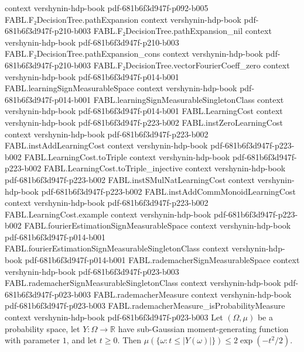 \begin{theorem}
  {context}
  {vershynin-hdp-book}
  {pdf-681b6f3d947f-p092-b005}
\proofstep
  {FABL.F₂DecisionTree.pathExpansion}
  {context}
  {vershynin-hdp-book}
  {pdf-681b6f3d947f-p210-b003}
\proofstep
  {FABL.F₂DecisionTree.pathExpansion_nil}
  {context}
  {vershynin-hdp-book}
  {pdf-681b6f3d947f-p210-b003}
\proofstep
  {FABL.F₂DecisionTree.pathExpansion_cons}
  {context}
  {vershynin-hdp-book}
  {pdf-681b6f3d947f-p210-b003}
\proofstep
  {FABL.F₂DecisionTree.vectorFourierCoeff_zero}
  {context}
  {vershynin-hdp-book}
  {pdf-681b6f3d947f-p014-b001}
\proofstep
  {FABL.learningSignMeasurableSpace}
  {context}
  {vershynin-hdp-book}
  {pdf-681b6f3d947f-p014-b001}
\proofstep
  {FABL.learningSignMeasurableSingletonClass}
  {context}
  {vershynin-hdp-book}
  {pdf-681b6f3d947f-p014-b001}
\proofstep
  {FABL.LearningCost}
  {context}
  {vershynin-hdp-book}
  {pdf-681b6f3d947f-p223-b002}
\proofstep
  {FABL.instZeroLearningCost}
  {context}
  {vershynin-hdp-book}
  {pdf-681b6f3d947f-p223-b002}
\proofstep
  {FABL.instAddLearningCost}
  {context}
  {vershynin-hdp-book}
  {pdf-681b6f3d947f-p223-b002}
\proofstep
  {FABL.LearningCost.toTriple}
  {context}
  {vershynin-hdp-book}
  {pdf-681b6f3d947f-p223-b002}
\proofstep
  {FABL.LearningCost.toTriple_injective}
  {context}
  {vershynin-hdp-book}
  {pdf-681b6f3d947f-p223-b002}
\proofstep
  {FABL.instSMulNatLearningCost}
  {context}
  {vershynin-hdp-book}
  {pdf-681b6f3d947f-p223-b002}
\proofstep
  {FABL.instAddCommMonoidLearningCost}
  {context}
  {vershynin-hdp-book}
  {pdf-681b6f3d947f-p223-b002}
\proofstep
  {FABL.LearningCost.example}
  {context}
  {vershynin-hdp-book}
  {pdf-681b6f3d947f-p223-b002}
\proofstep
  {FABL.fourierEstimationSignMeasurableSpace}
  {context}
  {vershynin-hdp-book}
  {pdf-681b6f3d947f-p014-b001}
\proofstep
  {FABL.fourierEstimationSignMeasurableSingletonClass}
  {context}
  {vershynin-hdp-book}
  {pdf-681b6f3d947f-p014-b001}
\proofstep
  {FABL.rademacherSignMeasurableSpace}
  {context}
  {vershynin-hdp-book}
  {pdf-681b6f3d947f-p023-b003}
\proofstep
  {FABL.rademacherSignMeasurableSingletonClass}
  {context}
  {vershynin-hdp-book}
  {pdf-681b6f3d947f-p023-b003}
\proofstep
  {FABL.rademacherMeasure}
  {context}
  {vershynin-hdp-book}
  {pdf-681b6f3d947f-p023-b003}
\proofstep
  {FABL.rademacherMeasure_isProbabilityMeasure}
  {context}
  {vershynin-hdp-book}
  {pdf-681b6f3d947f-p023-b003}
\label{FABL.measureReal_abs_ge_le_two_mul_exp}
\leanok
{}
Let $(\Omega,\mu)$ be a probability space, let $Y:\Omega\to\mathbb{R}$ have sub-Gaussian
moment-generating function with parameter $1$, and let $t\ge 0$. Then $\mu(\{\omega:
t\le |Y(\omega)|\})\le 2\exp(-t^2/2)$.
\end{theorem}

